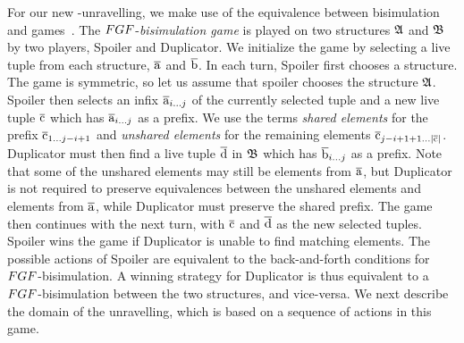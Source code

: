 For our new \FGF-unravelling, we make use of the equivalence between bisimulation and games~\cite[Sec. 1.2.1]{Gradel014}.
The $\FGF$-\emph{bisimulation game} is played on two structures ${\mathfrak{A}}$ and ${\mathfrak{B}}$ by two players, Spoiler and Duplicator.
We initialize the game by selecting a live tuple from each structure, $\overline{\mathrm{a}}$ and $\overline{\mathrm{b}}$.
In each turn, Spoiler first chooses a structure.
The game is symmetric, so let us assume that spoiler chooses the structure ${\mathfrak{A}}$.
Spoiler then selects an infix $\overline{\mathrm{a}}_{i\ldots j}$ of the currently selected tuple and a new live tuple $\overline{\mathrm{c}}$ which has $\overline{\mathrm{a}}_{i\ldots j}$ as a prefix.
We use the terms \emph{shared elements} for the prefix $\overline{\mathrm{c}}_{1\ldots j-i+1}$ and \emph{unshared elements} for the remaining elements $\overline{\mathrm{c}}_{j-i+1+1\ldots|\overline{\mathrm{c}}|}$.
Duplicator must then find a live tuple $\overline{\mathrm{d}}$ in ${\mathfrak{B}}$ which has $\overline{\mathrm{b}}_{i\ldots j}$ as a prefix.
Note that some of the unshared elements may still be elements from $\overline{\mathrm{a}}$, but Duplicator is not required to preserve equivalences between the unshared elements and elements from $\overline{\mathrm{a}}$, while Duplicator must preserve the shared prefix.
The game then continues with the next turn, with $\overline{\mathrm{c}}$ and $\overline{\mathrm{d}}$ as the new selected tuples.
Spoiler wins the game if Duplicator is unable to find matching elements.
The possible actions of Spoiler are equivalent to the back-and-forth conditions for $\FGF$-bisimulation.
A winning strategy for Duplicator is thus equivalent to a $\FGF$-bisimulation between the two structures, and vice-versa.
We next describe the domain of the unravelling, which is based on a sequence of actions in this game.

